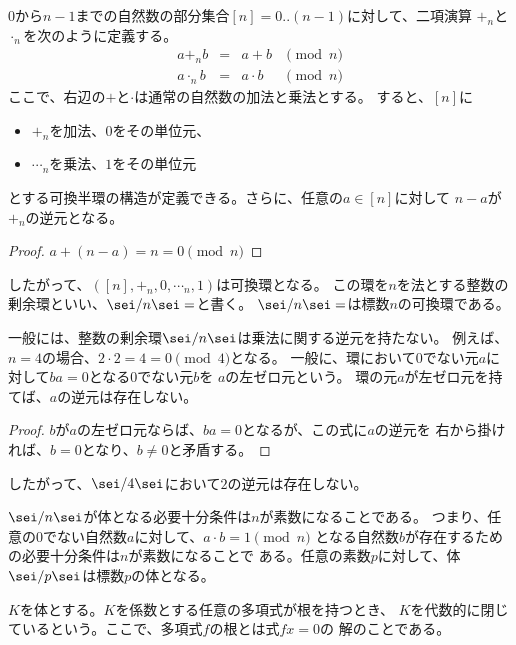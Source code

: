 	\begin{example}[整数の剰余環]\label{eg:整数の剰余環} %
		$0$から$n-1$までの自然数の部分集合$[n]=0..(n-1)$に対して、二項演算
		$+_n$と$\cdot_n$を次のように定義する。
		\begin{equation*}\begin{array}{rcll} %
			a +_n b &=& a + b & \pmod{n} \\
			a \cdot_n b &=& a\cdot b & \pmod{n}
		\end{array}\end{equation*} %
		ここで、右辺の$+$と$\cdot$は通常の自然数の加法と乗法とする。
		すると、$[n]$に
		\begin{itemize}\setlength{\itemsep}{-1mm} %
			\item $+_n$を加法、$0$をその単位元、
			\item $\cdots_n$を乗法、$1$をその単位元
		\end{itemize} %
		とする可換半環の構造が定義できる。さらに、任意の$a\in[n]$に対して
		$n-a$が$+_n$の逆元となる。
		\begin{proof} %
			$a+(n-a)=n=0\pmod{n}$
		\end{proof} %
		したがって、$([n],+_n,0,\cdots_n,1)$は可換環となる。
		この環を$n$を法とする整数の剰余環といい、$\sei/n\sei=$と書く。
		$\sei/n\sei=$は標数$n$の可換環である。
	\end{example} %

	\begin{note}[整数の剰余体]\label{note:整数の剰余体} %
		一般には、整数の剰余環$\sei/n\sei$は乗法に関する逆元を持たない。
		例えば、$n=4$の場合、$2\cdot 2=4=0\pmod{4}$となる。
		一般に、環において$0$でない元$a$に対して$ba=0$となる$0$でない元$b$を
		$a$の左ゼロ元という。
		環の元$a$が左ゼロ元を持てば、$a$の逆元は存在しない。
		\begin{proof} %
			$b$が$a$の左ゼロ元ならば、$ba=0$となるが、この式に$a$の逆元を
			右から掛ければ、$b=0$となり、$b\neq0$と矛盾する。
		\end{proof} %
		したがって、$\sei/4\sei$において$2$の逆元は存在しない。

		$\sei/n\sei$が体となる必要十分条件は$n$が素数になることである。
		つまり、任意の$0$でない自然数$a$に対して、$a\cdot b = 1 \pmod{n}$
		となる自然数$b$が存在するための必要十分条件は$n$が素数になることで
		ある。任意の素数$p$に対して、体$\sei/p\sei$は標数$p$の体となる。
	\end{note} %

	\begin{definition}[代数的に閉じた体]\label{def:代数的に閉じた体} %
		$K$を体とする。$K$を係数とする任意の多項式が根を持つとき、
		$K$を代数的に閉じているという。ここで、多項式$f$の根とは式$fx=0$の
		解のことである。
	\end{definition} %

